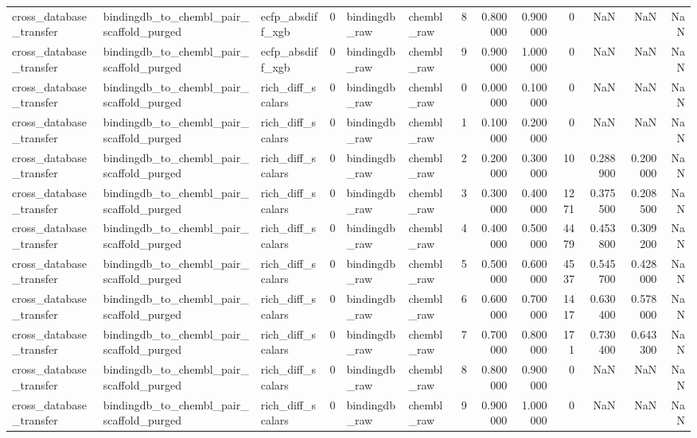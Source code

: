 \begin{longtable}{lllrllrrrrrrr}
cross\_database\_transfer & bindingdb\_to\_chembl\_pair\_scaffold\_purged & ecfp\_absdiff\_xgb & 0 & bindingdb\_raw & chembl\_raw & 8 & 0.800000 & 0.900000 & 0 & NaN & NaN & NaN \\
cross\_database\_transfer & bindingdb\_to\_chembl\_pair\_scaffold\_purged & ecfp\_absdiff\_xgb & 0 & bindingdb\_raw & chembl\_raw & 9 & 0.900000 & 1.000000 & 0 & NaN & NaN & NaN \\
cross\_database\_transfer & bindingdb\_to\_chembl\_pair\_scaffold\_purged & rich\_diff\_scalars & 0 & bindingdb\_raw & chembl\_raw & 0 & 0.000000 & 0.100000 & 0 & NaN & NaN & NaN \\
cross\_database\_transfer & bindingdb\_to\_chembl\_pair\_scaffold\_purged & rich\_diff\_scalars & 0 & bindingdb\_raw & chembl\_raw & 1 & 0.100000 & 0.200000 & 0 & NaN & NaN & NaN \\
cross\_database\_transfer & bindingdb\_to\_chembl\_pair\_scaffold\_purged & rich\_diff\_scalars & 0 & bindingdb\_raw & chembl\_raw & 2 & 0.200000 & 0.300000 & 10 & 0.288900 & 0.200000 & NaN \\
cross\_database\_transfer & bindingdb\_to\_chembl\_pair\_scaffold\_purged & rich\_diff\_scalars & 0 & bindingdb\_raw & chembl\_raw & 3 & 0.300000 & 0.400000 & 1271 & 0.375500 & 0.208500 & NaN \\
cross\_database\_transfer & bindingdb\_to\_chembl\_pair\_scaffold\_purged & rich\_diff\_scalars & 0 & bindingdb\_raw & chembl\_raw & 4 & 0.400000 & 0.500000 & 4479 & 0.453800 & 0.309200 & NaN \\
cross\_database\_transfer & bindingdb\_to\_chembl\_pair\_scaffold\_purged & rich\_diff\_scalars & 0 & bindingdb\_raw & chembl\_raw & 5 & 0.500000 & 0.600000 & 4537 & 0.545700 & 0.428000 & NaN \\
cross\_database\_transfer & bindingdb\_to\_chembl\_pair\_scaffold\_purged & rich\_diff\_scalars & 0 & bindingdb\_raw & chembl\_raw & 6 & 0.600000 & 0.700000 & 1417 & 0.630400 & 0.578000 & NaN \\
cross\_database\_transfer & bindingdb\_to\_chembl\_pair\_scaffold\_purged & rich\_diff\_scalars & 0 & bindingdb\_raw & chembl\_raw & 7 & 0.700000 & 0.800000 & 171 & 0.730400 & 0.643300 & NaN \\
cross\_database\_transfer & bindingdb\_to\_chembl\_pair\_scaffold\_purged & rich\_diff\_scalars & 0 & bindingdb\_raw & chembl\_raw & 8 & 0.800000 & 0.900000 & 0 & NaN & NaN & NaN \\
cross\_database\_transfer & bindingdb\_to\_chembl\_pair\_scaffold\_purged & rich\_diff\_scalars & 0 & bindingdb\_raw & chembl\_raw & 9 & 0.900000 & 1.000000 & 0 & NaN & NaN & NaN \\

\end{longtable}
